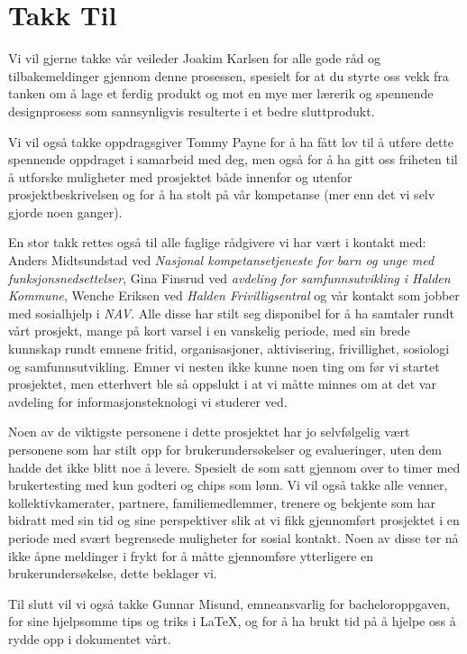 \cleardoublepage
\chapter*{Takk Til}
Vi vil gjerne takke vår veileder Joakim Karlsen for alle gode råd og tilbakemeldinger gjennom denne prosessen, spesielt for at du styrte oss vekk fra tanken om å lage et ferdig produkt og mot en mye mer lærerik og spennende designprosess som sannsynligvis resulterte i et bedre sluttprodukt.

Vi vil også takke oppdragsgiver Tommy Payne for å ha fått lov til å utføre dette spennende oppdraget i samarbeid med deg, men også for å ha gitt oss friheten til å utforske muligheter med prosjektet både innenfor og utenfor prosjektbeskrivelsen og for å ha stolt på vår kompetanse (mer enn det vi selv gjorde noen ganger).

En stor takk rettes også til alle faglige rådgivere vi har vært i kontakt med: Anders Midtsundstad ved {\em Nasjonal kompetansetjeneste for barn og unge med funksjonsnedsettelser}, Gina Finsrud ved {\em avdeling for samfunnsutvikling i Halden Kommune}, Wenche Eriksen ved {\em Halden Frivilligsentral} og vår kontakt som jobber med sosialhjelp i {\em NAV}. Alle disse har stilt seg disponibel for å ha samtaler rundt vårt prosjekt, mange på kort varsel i en vanskelig periode, med sin brede kunnskap rundt emnene fritid, organisasjoner, aktivisering, frivillighet, sosiologi og samfunnsutvikling. Emner vi nesten ikke kunne noen ting om før vi startet prosjektet, men etterhvert ble så oppslukt i at vi måtte minnes om at det var avdeling for informasjonsteknologi vi studerer ved.

Noen av de viktigste personene i dette prosjektet har jo selvfølgelig vært personene som har stilt opp for brukerundersøkelser og evalueringer, uten dem hadde det ikke blitt noe å levere. Spesielt de som satt gjennom over to timer med brukertesting med kun godteri og chips som lønn. Vi vil også takke alle venner, kollektivkamerater, partnere, familiemedlemmer, trenere og bekjente som har bidratt med sin tid og sine perspektiver slik at vi fikk gjennomført prosjektet i en periode med svært begrensede muligheter for sosial kontakt. Noen av disse tør nå ikke åpne meldinger i frykt for å måtte gjennomføre ytterligere en brukerundersøkelse, dette beklager vi.

Til slutt vil vi også takke Gunnar Misund, emneansvarlig for bacheloroppgaven, for sine hjelpsomme tips og triks i LaTeX, og for å ha brukt tid på å hjelpe oss å rydde opp i dokumentet vårt.
